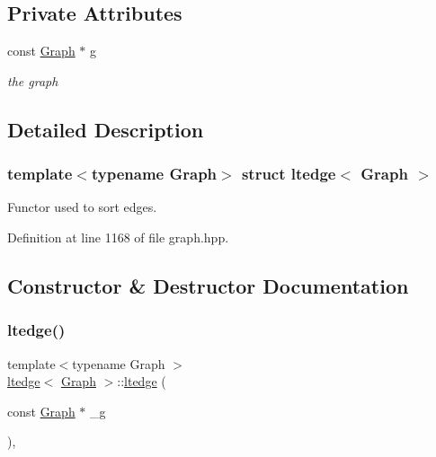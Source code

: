 \subsection*{Private Attributes}
\begin{DoxyCompactItemize}
\item 
const \hyperlink{structGraph}{Graph} $\ast$ \hyperlink{structltedge_a05067d29c70c08f2359e58c175ab68b8}{g}
\begin{DoxyCompactList}\small\item\em the graph \end{DoxyCompactList}\end{DoxyCompactItemize}


\subsection{Detailed Description}
\subsubsection*{template$<$typename Graph$>$\newline
struct ltedge$<$ Graph $>$}

Functor used to sort edges. 

Definition at line 1168 of file graph.\+hpp.



\subsection{Constructor \& Destructor Documentation}
\mbox{\label{structltedge_a2bca6fca02105aa2460903cbca279f70}} 
\subsubsection{\texorpdfstring{ltedge()}{ltedge()}}
{\footnotesize\ttfamily template$<$typename Graph $>$ \\
\hyperlink{structltedge}{ltedge}$<$ \hyperlink{structGraph}{Graph} $>$\+::\hyperlink{structltedge}{ltedge} (\begin{DoxyParamCaption}\item[{const \hyperlink{structGraph}{Graph} $\ast$}]{\+\_\+g }\end{DoxyParamCaption})\hspace{0.3cm}{\ttfamily [inline]}, {\ttfamily [explicit]}}



